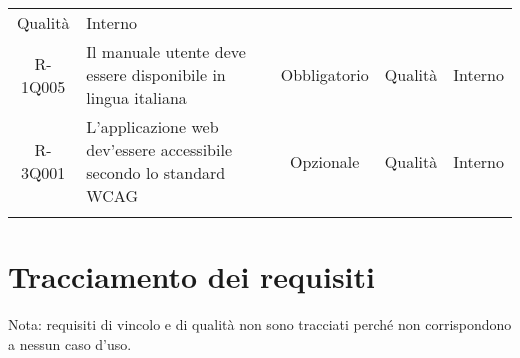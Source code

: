 \begin{tabularx}{\textwidth}{cXccc}
	Qualità &
	
	Interno \\
	R-1Q005 &
	
	Il manuale utente deve essere disponibile in lingua italiana   &
	
	Obbligatorio &
	
	Qualità &
	
	Interno \\
		
	R-3Q001 &
	
	L'applicazione web dev'essere accessibile secondo lo standard WCAG   &
	
	Opzionale &
	
	Qualità &
	
	Interno \\
	\rowcolor{white}
	 \caption{Tabella requisiti di qualità} \label{tab:tabellarequisitiqualità}
\end{tabularx}


\section{Tracciamento dei requisiti}
Nota: requisiti di vincolo e di qualità non sono tracciati perché non corrispondono a nessun caso d'uso.
